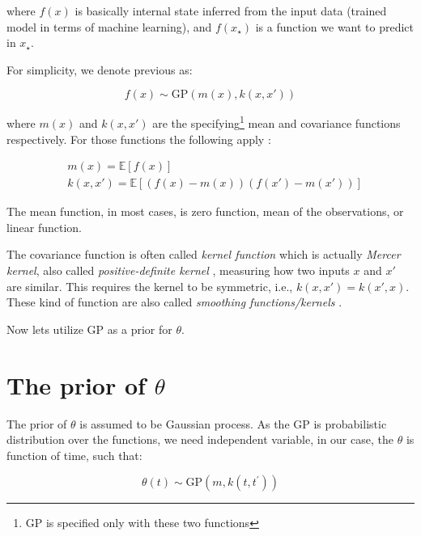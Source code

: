 \documentclass[
  digital, %
  oneside, %
  lof,     %
  lot,     %
]{fithesis4}
\begin{document}
where $f(x)$ is basically internal state 
inferred from the input data (trained model 
in terms of machine learning), and $f(x_\star)$
is a function we want to predict in $x_\star$.

For simplicity, we denote previous as:

\begin{equation}
  f(x) \sim \text{GP} \left( m \left( x \right), k \left( x, x' \right) \right)
\end{equation}

where $m \left( x \right)$ and $k\left( x, x' \right)$ are 
the specifying\footnote{GP is specified only with these two functions} mean and
covariance functions respectively.
For those functions the following apply \cite{rasmussen2004}:

\begin{equation}
\begin{split}
  & m(x) = \mathbb{E} \left[ f(x) \right] \\
  & k \left( x, x' \right) = \mathbb{E} \left[ 
    \left( f \left( x \right) - m \left( x \right) \right)
    \left( f \left( x' \right) - m \left( x' \right) \right)
  \right]
\end{split}
\end{equation}

The mean function, in most cases, is zero function,
mean of the observations, or linear function.

The covariance function is often called 
\textit{kernel function} which is actually \textit{Mercer kernel}, also called 
\textit{positive-definite kernel} \cite{murphy2021}, 
measuring how two inputs $x$ and $x'$ are similar. 
This requires the kernel to be symmetric, i.e., 
$k \left( x, x' \right) = k \left( x', x \right)$.
These kind of function are also called
\textit{smoothing functions/kernels} \cite{martin2016}.

Now lets utilize GP as a prior for $\theta$.

\section{The prior of \texorpdfstring{$\theta$}{Lg}}

The prior of $\theta$ is assumed to be Gaussian process. 
As the GP is probabilistic distribution over the functions,
we need independent variable, in our case, the 
$\theta$ is function of time, such that:

\begin{equation}
  \theta(t) \sim \text{GP}(m, k(t, t^\prime))
\end{equation}
\end{document}
